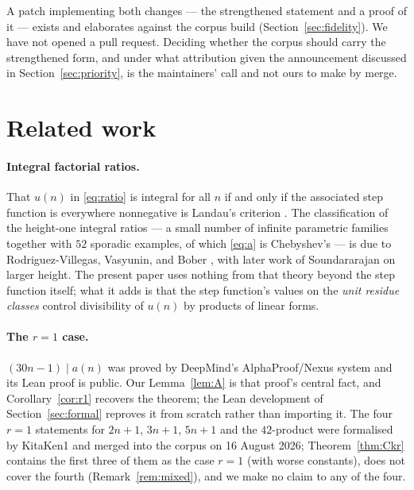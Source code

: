 \documentclass[11pt]{article}
\theoremstyle{plain}
\theoremstyle{definition}
\theoremstyle{remark}
\numberwithin{equation}{section}
\begin{document}
A patch implementing both changes --- the strengthened statement and a proof of it --- exists and
elaborates against the corpus build (Section~\ref{sec:fidelity}). We have not opened a pull
request. Deciding whether the corpus should carry the strengthened form, and under what
attribution given the announcement discussed in Section~\ref{sec:priority}, is the maintainers'
call and not ours to make by merge.

\section{Related work}
\label{sec:related}

\paragraph{Integral factorial ratios.} That $u(n)$ in \eqref{eq:ratio} is integral for all $n$ if
and only if the associated step function is everywhere nonnegative is Landau's criterion
\cite{landau}. The classification of the height-one integral ratios --- a small number of infinite
parametric families together with $52$ sporadic examples, of which \eqref{eq:a} is Chebyshev's
--- is due to
Rodriguez-Villegas, Vasyunin, and Bober \cite{rodriguezvillegas,bober}, with later work of
Soundararajan on larger height. The present paper uses nothing from that theory beyond the step
function itself; what it adds is that the step function's values on the \emph{unit residue
classes} control divisibility of $u(n)$ by products of linear forms.

\paragraph{The $r=1$ case.} $(30n-1)\mid a(n)$ was proved by DeepMind's AlphaProof/Nexus system
\cite{nexus} and its Lean proof is public. Our Lemma~\ref{lem:A} is that proof's central fact,
and Corollary~\ref{cor:r1} recovers the theorem; the Lean development of
Section~\ref{sec:formal} reproves it from scratch rather than importing it. The four $r=1$
statements for $2n+1$, $3n+1$, $5n+1$ and the $42$-product were formalised by KitaKen1 and merged
into the corpus on 16 August 2026; Theorem~\ref{thm:Ckr} contains the first three of them as the
case $r=1$ (with worse constants), does not cover the fourth (Remark~\ref{rem:mixed}), and we
make no claim to any of the four.
\end{document}
